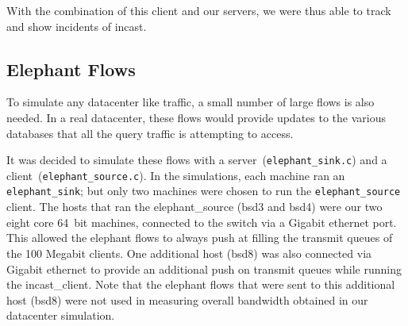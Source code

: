\documentclass[12pt]{article}
\begin{document}
With the combination of this client and our servers, we were thus able to track and show incidents
of incast.


\subsection{Elephant Flows}
\label{elephants}
To simulate any datacenter like traffic, a small number of large flows is also needed. In a
real datacenter, these flows would provide updates to the various databases that all the query traffic is attempting to access. 

It was decided to simulate these flows
with a server~(\texttt{elephant\_sink.c}) and a client~(\texttt{elephant\_source.c}). In the simulations, each machine ran
an \texttt{elephant\_sink}; but only two machines were chosen to run the \texttt{elephant\_source} client. The hosts
that ran the elephant\_source (bsd3 and bsd4) were our two eight core 64~bit machines, connected to the switch
via a Gigabit ethernet port. This allowed the elephant flows to always push at filling the transmit queues
of the 100 Megabit clients. One additional host (bsd8) was also connected via Gigabit ethernet to provide
an additional push on transmit queues while running the incast\_client. Note that the elephant flows that
were sent to this additional host (bsd8) were not used in measuring overall bandwidth obtained 
in our datacenter simulation.
\\
\end{document}
